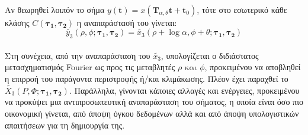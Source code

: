 \paragraph*{}
Αν θεωρηθεί λοιπόν το σήμα $y(\textbf{t}) = x(\textbf{T}_{\alpha,\theta}\textbf{t}+\textbf{t}_0)$, τότε στο εσωτερικό κάθε κλάσης $C(\boldsymbol{\tau_1},\boldsymbol{\tau_2})$ η αναπαράστασή του γίνεται:
\begin{equation}
\tilde{y_3}(\rho,\phi;\boldsymbol{\tau_1},\boldsymbol{\tau_2}) = \tilde{x_3}(\rho+\log\alpha,\phi+\theta;\boldsymbol{\tau_1},\boldsymbol{\tau_2})
\end{equation}

\paragraph*{}
Στη συνέχεια, από την αναπαράσταση του $\tilde{x_3}$, υπολογίζεται ο διδιάστατος μετασχηματισμός Fourier ως προς τις μεταβλητές $\rho \text{ και } \phi$, προκειμένου να αποβληθεί η επιρροή του παράγοντα περιστροφής ή/και κλιμάκωσης. Πλέον έχει παραχθεί το $\tilde{X_3}(P,\Phi;\boldsymbol{\tau_1},\boldsymbol{\tau_2})$. Παράλληλα, γίνονται κάποιες αλλαγές και ενέργειες, προκειμένου να προκύψει μια αντιπροσωπευτική αναπαράσταση του σήματος, η οποία είναι όσο πιο οικονομική γίνεται, από άποψη όγκου δεδομένων αλλά και από άποψη υπολογιστικών απαιτήσεων για τη δημιουργία της.

